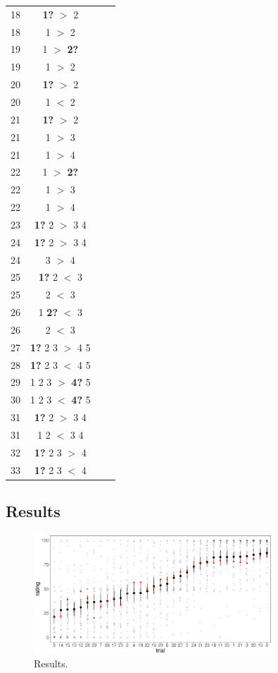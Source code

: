 \documentclass[11pt]{article}
\begin{document}
{\begin{longtable}{cccc}
 \midrule
   18 & \textbf{1?} $>$ 2 \\ 
   18 & 1 $>$ 2 \\ 
   \midrule
   19 & 1 $>$ \textbf{2?} \\ 
   19 & 1 $>$ 2 \\ 
   \midrule
   20 & \textbf{1?} $>$ 2 \\ 
   20 & 1 $<$ 2 \\ 
   \midrule
   21 & \textbf{1?} $>$ 2 \\ 
   21 & 1 $>$ 3 \\ 
   21 & 1 $>$ 4
 \\ 
 \midrule
   22 & 1 $>$ \textbf{2?} \\ 
   22 & 1 $>$ 3 \\ 
   22 & 1 $>$ 4
 \\ 
 \midrule
   23 & \textbf{1?} 2 $>$ 3 4 \\ 
   \midrule
   24 & \textbf{1?} 2 $>$ 3 4 \\ 
   24 & 3 $>$ 4 \\ 
   \midrule
   25 & \textbf{1?} 2 $<$ 3 \\ 
   25 & 2 $<$ 3 \\ 
   \midrule
   26 & 1 \textbf{2?} $<$ 3 \\ 
   26 & 2 $<$ 3 \\ 
   \midrule
   27 & \textbf{1?} 2 3 $>$ 4 5 \\ 
   \midrule
   28 & \textbf{1?} 2 3 $<$ 4 5 \\ 
   \midrule
   29 & 1 2 3 $>$ \textbf{4?} 5 \\ 
   \midrule
   30 & 1 2 3 $<$ \textbf{4?} 5 \\ 
   \midrule
   31 & \textbf{1?} 2 $>$ 3 4 \\ 
   31 & 1 2 $<$ 3 4 \\ 
   \midrule
   32 & \textbf{1?} 2 3 $>$ 4 \\ 
   \midrule
   33 & \textbf{1?} 2 3 $<$ 4 \\ 
 \bottomrule
\end{longtable}
}

\subsection{Results}
\label{sub:results}

\begin{figure}[t]
  \centering
  \includegraphics[width=0.8\textwidth]{exp2_means}
  \caption{Results.}
  \label{fig:exp2_means}
\end{figure}
\end{document}
